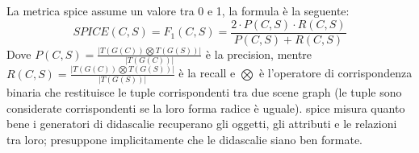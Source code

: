 La metrica \acrshort{spice} assume un valore tra 0 e 1, la formula è la seguente:
\begin{equation*}
SPICE(C,S) = F_1(C,S) = \frac{2 \cdot P(C,S) \cdot R(C,S)}{P(C,S) + R(C,S)}
\end{equation*}
Dove $P(C,S) = \frac{|T(G(C)) \bigotimes T(G(S))|}{|T(G(C))|}$ è la precision, mentre $R(C,S) = \frac{|T(G(C)) \bigotimes T(G(S))|}{|T(G(S))|}$ è la recall e $\bigotimes$ è l'operatore di corrispondenza binaria che restituisce le tuple corrispondenti tra due scene graph (le tuple sono considerate corrispondenti se la loro forma radice è uguale).
\acrshort{spice} misura quanto bene i generatori di didascalie recuperano gli oggetti, gli attributi e le relazioni tra loro; presuppone implicitamente che le didascalie siano ben formate.
